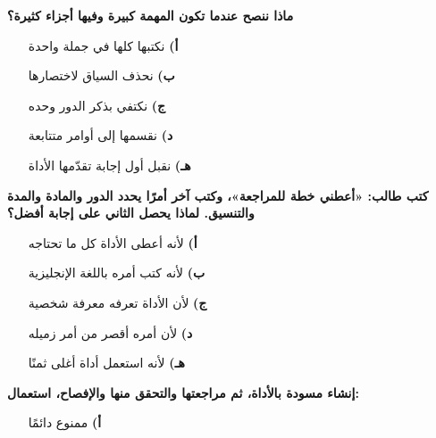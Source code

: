 \documentclass[11pt,a4paper]{article}
\begin{document}
\begin{multicols}{2}
\begin{minipage}{\linewidth}
\begin{itemize}[leftmargin=0.95cm, labelsep=4pt, itemsep=0pt, topsep=2pt, parsep=0pt]
\end{itemize}
\end{minipage}\par\vspace{7pt plus 4pt}
\noindent\begin{minipage}{\linewidth}
\hangindent=0.7cm\textbf{ماذا ننصح عندما تكون المهمة كبيرة وفيها أجزاء كثيرة؟}
\begin{itemize}[leftmargin=0.95cm, labelsep=4pt, itemsep=0pt, topsep=2pt, parsep=0pt]
  \item[\textbf{أ)}] نكتبها كلها في جملة واحدة
  \item[\textbf{ب)}] نحذف السياق لاختصارها
  \item[\textbf{ج)}] نكتفي بذكر الدور وحده
  \item[\textbf{د)}] نقسمها إلى أوامر متتابعة
  \item[\textbf{هـ)}] نقبل أول إجابة تقدّمها الأداة
\end{itemize}
\end{minipage}\par\vspace{7pt plus 4pt}
\noindent\begin{minipage}{\linewidth}
\hangindent=0.7cm\textbf{كتب طالب: «أعطني خطة للمراجعة»، وكتب آخر أمرًا يحدد الدور والمادة والمدة والتنسيق. لماذا يحصل الثاني على إجابة أفضل؟}
\begin{itemize}[leftmargin=0.95cm, labelsep=4pt, itemsep=0pt, topsep=2pt, parsep=0pt]
  \item[\textbf{أ)}] لأنه أعطى الأداة كل ما تحتاجه
  \item[\textbf{ب)}] لأنه كتب أمره باللغة الإنجليزية
  \item[\textbf{ج)}] لأن الأداة تعرفه معرفة شخصية
  \item[\textbf{د)}] لأن أمره أقصر من أمر زميله
  \item[\textbf{هـ)}] لأنه استعمل أداة أغلى ثمنًا
\end{itemize}
\end{minipage}\par\vspace{7pt plus 4pt}
\noindent\begin{minipage}{\linewidth}
\hangindent=0.7cm\textbf{إنشاء مسودة بالأداة، ثم مراجعتها والتحقق منها والإفصاح، استعمال:}
\begin{itemize}[leftmargin=0.95cm, labelsep=4pt, itemsep=0pt, topsep=2pt, parsep=0pt]
  \item[\textbf{أ)}] ممنوع دائمًا

\end{itemize}
\end{minipage}
\end{multicols}
\end{document}
